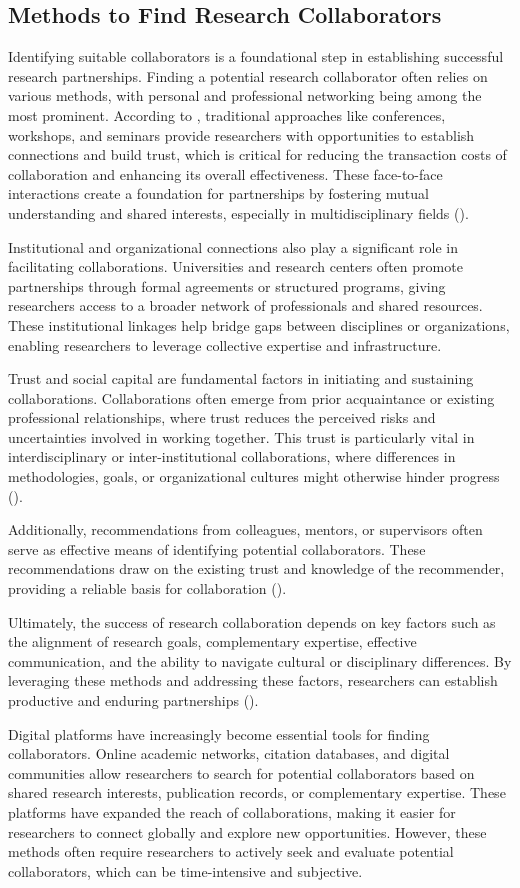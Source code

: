 \subsection*{Methods to Find Research Collaborators}
Identifying suitable collaborators is a foundational step in establishing successful research partnerships.
Finding a potential research collaborator often relies on various methods, with personal and professional networking being among the most prominent.
According to \cite{KATZ19971}, traditional approaches like conferences, workshops, and seminars provide researchers with opportunities to establish connections and build trust, which is critical for reducing the transaction costs of collaboration and enhancing its overall effectiveness.
These face-to-face interactions create a foundation for partnerships by fostering mutual understanding and shared interests, especially in multidisciplinary fields (\cite{Bozeman2014}).

Institutional and organizational connections also play a significant role in facilitating collaborations. Universities and research centers often promote partnerships through formal agreements or structured programs, giving researchers access to a broader network of professionals and shared resources. These institutional linkages help bridge gaps between disciplines or organizations, enabling researchers to leverage collective expertise and infrastructure.

Trust and social capital are fundamental factors in initiating and sustaining collaborations. Collaborations often emerge from prior acquaintance or existing professional relationships, where trust reduces the perceived risks and uncertainties involved in working together. This trust is particularly vital in interdisciplinary or inter-institutional collaborations, where differences in methodologies, goals, or organizational cultures might otherwise hinder progress (\cite{Bozeman2014}).

Additionally, recommendations from colleagues, mentors, or supervisors often serve as effective means of identifying potential collaborators.
These recommendations draw on the existing trust and knowledge of the recommender, providing a reliable basis for collaboration (\cite{Bozeman2014}).

Ultimately, the success of research collaboration depends on key factors such as the alignment of research goals, complementary expertise, effective communication, and the ability to navigate cultural or disciplinary differences.
By leveraging these methods and addressing these factors, researchers can establish productive and enduring partnerships (\cite{Bozeman2014}).

Digital platforms have increasingly become essential tools for finding collaborators. Online academic networks, citation databases, and digital communities allow researchers to search for potential collaborators based on shared research interests, publication records, or complementary expertise. These platforms have expanded the reach of collaborations, making it easier for researchers to connect globally and explore new opportunities.
However, these methods often require researchers to actively seek and evaluate potential collaborators, which can be time-intensive and subjective.
